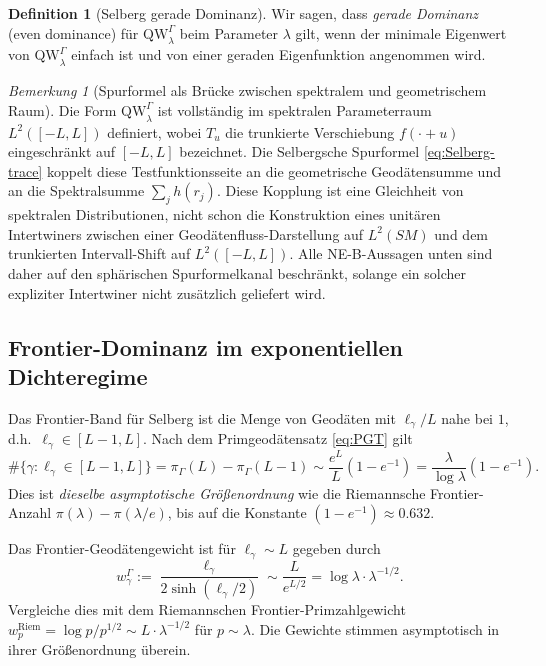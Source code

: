 \documentclass[12pt,a4paper]{article}
\theoremstyle{definition}
\newtheorem{definition}[theorem]{Definition}
\theoremstyle{remark}
\newtheorem{remark}[theorem]{Bemerkung}
\newcommand{\QW}{\mathrm{QW}}
\begin{document}
\begin{definition}[Selberg gerade Dominanz]
\label{def:Sel-ED}
Wir sagen, dass \emph{gerade Dominanz} (even dominance) für $\QW^\Gamma_\lambda$ beim Parameter
$\lambda$ gilt, wenn der minimale Eigenwert von $\QW^\Gamma_\lambda$ einfach ist und
von einer geraden Eigenfunktion angenommen wird.
\end{definition}

\begin{remark}[Spurformel als Brücke zwischen spektralem und geometrischem Raum]
\label{rem:two-spaces}
Die Form $\QW^\Gamma_\lambda$ ist vollständig im spektralen Parameterraum
$L^2([-L,L])$ definiert, wobei $T_u$ die trunkierte Verschiebung $f(\cdot + u)$
eingeschränkt auf $[-L,L]$ bezeichnet.  Die Selbergsche Spurformel
\eqref{eq:Selberg-trace} koppelt diese Testfunktionsseite an die geometrische
Geodätensumme und an die Spektralsumme $\sum_j h(r_j)$.  Diese Kopplung ist
eine Gleichheit von spektralen Distributionen, nicht schon die Konstruktion
eines unitären Intertwiners zwischen einer Geodätenfluss-Darstellung auf
$L^2(SM)$ und dem trunkierten Intervall-Shift auf $L^2([-L,L])$.  Alle
NE-B-Aussagen unten sind daher auf den sphärischen Spurformelkanal beschränkt,
solange ein solcher expliziter Intertwiner nicht zusätzlich geliefert wird.
\end{remark}

\subsection{Frontier-Dominanz im exponentiellen Dichteregime}

Das Frontier-Band für Selberg ist die Menge von Geodäten mit
$\ell_\gamma / L$ nahe bei $1$, d.h.\ $\ell_\gamma \in [L-1, L]$. Nach dem
Primgeodätensatz \eqref{eq:PGT} gilt
\begin{equation}
\label{eq:frontier-count-Sel}
\#\{\gamma : \ell_\gamma \in [L-1, L]\} = \pi_\Gamma(L) - \pi_\Gamma(L-1)
\sim \frac{e^L}{L}(1 - e^{-1}) = \frac{\lambda}{\log\lambda}(1 - e^{-1}).
\end{equation}
Dies ist \emph{dieselbe asymptotische Größenordnung} wie die Riemannsche Frontier-Anzahl
$\pi(\lambda) - \pi(\lambda/e)$, bis auf die Konstante $(1-e^{-1}) \approx 0.632$.

Das Frontier-Geodätengewicht ist für $\ell_\gamma \sim L$ gegeben durch
\begin{equation}
\label{eq:frontier-weight-Sel}
w^\Gamma_\gamma := \frac{\ell_\gamma}{2\sinh(\ell_\gamma/2)} \sim \frac{L}{e^{L/2}} = \log\lambda \cdot \lambda^{-1/2}.
\end{equation}
Vergleiche dies mit dem Riemannschen Frontier-Primzahlgewicht
$w_p^{\mathrm{Riem}} = \log p / p^{1/2} \sim L \cdot \lambda^{-1/2}$ für
$p \sim \lambda$. Die Gewichte stimmen asymptotisch in ihrer Größenordnung überein.
\end{document}
